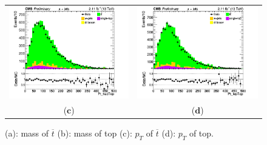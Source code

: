 \documentclass{cmspaper}
\begin{document}
\begin{figure}[htp]
\begin{tabular}{cc}
\includegraphics[scale=0.40]{results/Pt_hadTop.png}
& \hspace{-0.5cm} \includegraphics[scale=0.40]{results/Pt_lepTop.png}\\
   ($\mathbf{c}$)\qquad\qquad&($\mathbf{d}$)\qquad\qquad\qquad\\
\end{tabular}
\caption{(a): mass of $\overline{t}$ (b): mass of top (c): $p_{T}$ of $\overline{t}$ (d): $p_{T}$ of top.}\label{W_boson}
\end{figure}
\end{document}
